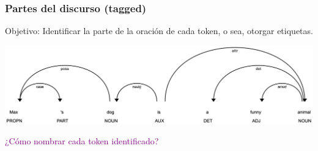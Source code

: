 \documentclass[
10pt, %
aspectratio=169, %
]{beamer}
\begin{document}
	
	\begin{frame}
		
		\frametitle{Partes del discurso (tagged)}
		
		\begin{alertblock}{} 
			Objetivo: Identificar la parte de la oración de cada token, o sea, otorgar etiquetas.
		\end{alertblock}
		
		\vspace{1\baselineskip}
		\centering	
		\includegraphics[scale=0.38]{pos-tagged.png} 
		
		\vspace{3\baselineskip}
		\pause
		\textcolor{purple}{¿Cómo nombrar cada token identificado?}
		
		
	\end{frame}
	
	
\end{document}
